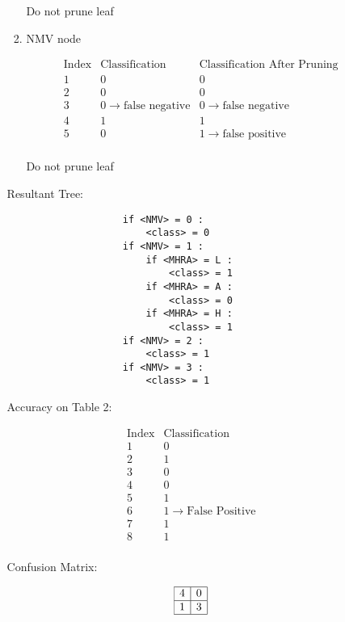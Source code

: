 \begin{enumerate}
\begin{enumerate}
\begin{enumerate}
						Do not prune leaf
					
					\item{NMV node}
					
						\[
							\begin{array}{c|l|l}
								\text{Index} & \text{Classification} & \text{Classification After Pruning} \\
								\hline
								1 & 0 & 0 \\
								2 & 0 & 0 \\
								3 & 0 \rightarrow \text{false negative} & 0 \rightarrow \text{false negative} \\
								4 & 1 & 1 \\
								5 & 0 & 1 \rightarrow \text{false positive} \\
							\end{array}
						\]
				
						Do not prune leaf
				
				\end{enumerate}
				
				Resultant Tree:
				
				\begin{lstlisting}
					if <NMV> = 0 :
						<class> = 0
					if <NMV> = 1 :
						if <MHRA> = L :
							<class> = 1
						if <MHRA> = A :
							<class> = 0
						if <MHRA> = H :
							<class> = 1
					if <NMV> = 2 :
						<class> = 1
					if <NMV> = 3 :
						<class> = 1
				\end{lstlisting}

				
				Accuracy on Table 2:
				
				\[
					\begin{array}{c|l}
						\text{Index} & \text{Classification} \\
						\hline
						1 & 0 \\
						2 & 1 \\
						3 & 0 \\
						4 & 0 \\  
						5 & 1 \\
						6 & 1 \rightarrow \text{False Positive} \\
						7 & 1 \\
						8 & 1 \\
					\end{array}
				\]
				
				Confusion Matrix:
				
				\[
					\begin{array}{|c|c|}
						\hline
						4 & 0 \\
						\hline
						1 & 3 \\
						\hline
					\end{array}
				\]
				

\end{enumerate}
\end{enumerate}
